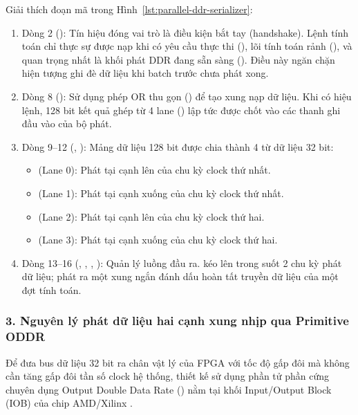 {Giải thích đoạn mã trong Hình~\ref{lst:parallel-ddr-serializer}:}
\begin{enumerate}
    \item {Dòng 2 ():} Tín hiệu  đóng vai trò là điều kiện bắt tay (handshake). Lệnh tính toán chỉ thực sự được nạp khi có yêu cầu thực thi (), lõi tính toán rảnh (), và quan trọng nhất là khối phát DDR đang sẵn sàng (). Điều này ngăn chặn hiện tượng ghi đè dữ liệu khi batch trước chưa phát xong.
    \item {Dòng 8 ():} Sử dụng phép OR thu gọn () để tạo xung nạp dữ liệu. Khi có hiệu lệnh, 128 bit kết quả ghép từ 4 lane () lập tức được chốt vào các thanh ghi đầu vào của bộ phát.
    \item {Dòng 9--12 (, ):} Mảng dữ liệu 128 bit được chia thành 4 từ dữ liệu 32 bit:
    \begin{itemize}
        \item {} (Lane 0): Phát tại {cạnh lên} của chu kỳ clock thứ nhất.
        \item {} (Lane 1): Phát tại {cạnh xuống} của chu kỳ clock thứ nhất.
        \item {} (Lane 2): Phát tại {cạnh lên} của chu kỳ clock thứ hai.
        \item {} (Lane 3): Phát tại {cạnh xuống} của chu kỳ clock thứ hai.
    \end{itemize}
    \item {Dòng 13--16 (, , , ):} Quản lý luồng đầu ra.  kéo lên trong suốt 2 chu kỳ phát dữ liệu;  phát ra một xung ngắn đánh dấu hoàn tất truyền dữ liệu của một đợt tính toán.
\end{enumerate}

\subsubsection*{3. Nguyên lý phát dữ liệu hai cạnh xung nhịp qua Primitive ODDR}

Để đưa bus dữ liệu 32 bit ra chân vật lý của FPGA với tốc độ gấp đôi mà không cần tăng gấp đôi tần số clock hệ thống, thiết kế sử dụng phần tử phần cứng chuyên dụng Output Double Data Rate () nằm tại khối Input/Output Block (IOB) của chip AMD/Xilinx \cite{amd_ug471}.

